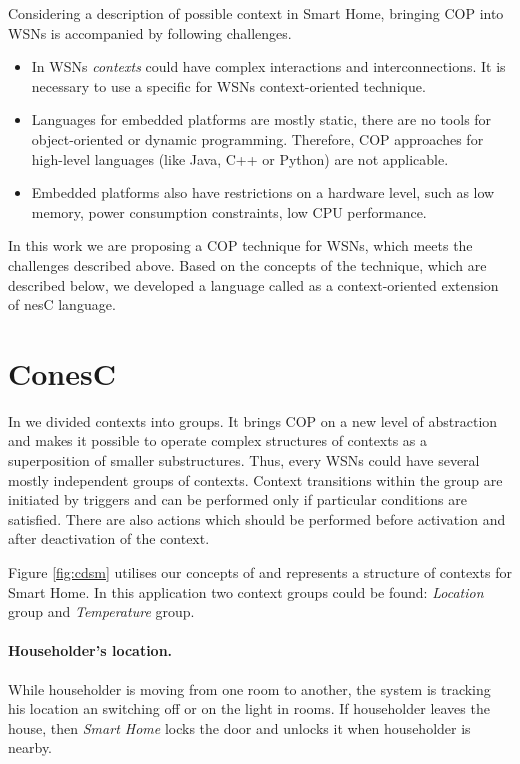 \documentclass{ubicomp-ext}
\begin{document}
Considering a description of possible context in Smart Home, bringing COP into WSNs is accompanied by following challenges.
\begin{itemize}\compresslist
\item
In WSNs \textit{contexts} could have complex interactions and interconnections. It is necessary to use a specific for WSNs context-oriented technique.
\item
Languages for embedded platforms are mostly static, there are no tools for object-oriented or dynamic programming. Therefore, COP approaches for high-level languages (like Java, C++ or Python) are not applicable.
\item
Embedded platforms also have restrictions on a hardware level, such as low memory, power consumption constraints, low CPU performance.
\end{itemize}

In this work we are proposing a COP technique for WSNs, which meets the challenges described above. Based on the concepts of the technique, which are described below, we developed a language called {} as a context-oriented extension of nesC language.
\section{ConesC}
In {} we divided contexts into groups. It brings COP on a new level of abstraction and makes it possible to operate complex structures of contexts as a superposition of smaller substructures. Thus, every WSNs could have several mostly independent groups of contexts. Context transitions within the group are initiated by triggers and can be performed only if particular conditions are satisfied. There are also actions which should be performed before activation and after deactivation of the context.

Figure \ref{fig:cdsm} utilises our concepts of {} and represents a structure of contexts for Smart Home. In this application two context groups could be found: \textit{Location} group and \textit{Temperature} group.

\paragraph{Householder's location.} While householder is moving from one room to another, the system is tracking his location an switching off or on the light in rooms. If householder leaves the house, then \textit{Smart Home} locks the door and unlocks it when householder is nearby.
\end{document}
